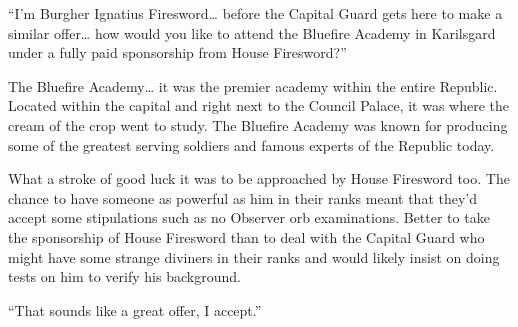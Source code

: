 \documentclass[a4paper,10pt]{book}
\begin{document}
“I’m Burgher Ignatius Firesword… before the Capital Guard gets here to make a similar offer… how would you like to attend the Bluefire Academy in Karilsgard under a fully paid sponsorship from House Firesword?”\par
The Bluefire Academy… it was the premier academy within the entire Republic. Located within the capital and right next to the Council Palace, it was where the cream of the crop went to study. The Bluefire Academy was known for producing some of the greatest serving soldiers and famous experts of the Republic today.\par
What a stroke of good luck it was to be approached by House Firesword too. The chance to have someone as powerful as him in their ranks meant that they’d accept some stipulations such as no Observer orb examinations. Better to take the sponsorship of House Firesword than to deal with the Capital Guard who might have some strange diviners in their ranks and would likely insist on doing tests on him to verify his background.\par
“That sounds like a great offer, I accept.”\par
\end{document}
